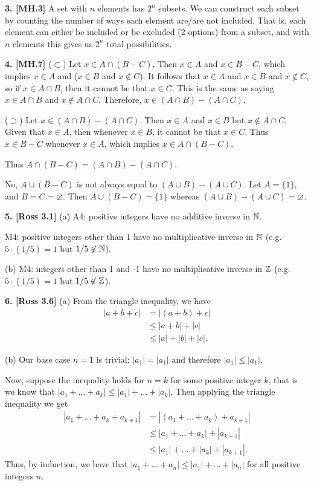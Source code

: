 \textbf{3. [MH.3]} A set with $n$ elements has $2^n$ subsets. We can construct each subset by counting the number of ways each element are/are not included. That is, each element can either be included or be excluded (2 options) from a subset, and with $n$ elements this gives us $2^n$ total possibilities.

\textbf{4. [MH.7]} ($\subset$) Let $x \in A \cap (B - C)$. Then $x \in A$ and $x \in B - C$, which implies $x \in A$ and ($x \in B$ and $x \not\in C$). It follows that $x \in A$ and $x \in B$ and $x \not\in C$, so if $x \in A \cap B$, then it cannot be that $x \in C$. This is the same as saying $x \in A \cap B$ and $x \not\in A \cap C$. Therefore, $x \in (A \cap B) - (A \cap C)$.

($\supset$) Let $x \in (A \cap B) - (A \cap C)$. Then $x \in A$ and $x \in B$ but $x \not\in A \cap C$. Given that $x \in A$, then whenever $x \in B$, it cannot be that $x \in C$. Thus $x \in B - C$ whenever $x \in A$, which implies $x \in A \cap (B - C)$.

Thus $A \cap (B - C) = (A \cap B) - (A \cap C)$.

No, $A \cup (B - C)$ is not always equal to $(A \cup B) - (A \cup C)$. Let $A = \{1\}$, and $B = C = \varnothing$. Then $A \cup (B - C) = \{1\}$ whereas $(A \cup B) - (A \cup C) = \varnothing$.

\textbf{5. [Ross 3.1]} (a) A4: positive integers have no additive inverse in $\mathbb{N}$.

M4: positive integers other than 1 have no multiplicative inverse in $\mathbb{N}$ (e.g. $5 \cdot (1/5) = 1$ but $1/5 \not\in \mathbb{N}$).

(b) M4: integers other than 1 and -1 have no multiplicative inverse in $\mathbb{Z}$ (e.g. $5 \cdot (1/5) = 1$ but $1/5 \not\in \mathbb{Z}$).

\textbf{6. [Ross 3.6]} (a) From the triangle inequality, we have
\begin{align*}
    |a + b + c| &= |(a + b) + c| \\
        &\leq |a + b| + |c| \\
        &\leq |a| + |b| + |c|.
\end{align*}

(b) Our base case $n = 1$ is trivial: $|a_1| = |a_1|$ and therefore $|a_1| \leq |a_1|$.

Now, suppose the inequality holds for $n = k$ for some positive integer $k$, that is we know that $|a_1 + \dots + a_k| \leq |a_1| + \dots + |a_k|$. Then applying the triangle inequality we get
\begin{align*}
    |a_1 + \dots + a_k + a_{k + 1}| &= |(a_1 + \dots + a_k) + a_{k + 1}| \\
        &\leq |a_1 + \dots + a_k| + |a_{k + 1}| \\
        &\leq |a_1| + \dots + |a_k| + |a_{k + 1}|.
\end{align*}
Thus, by induction, we have that $|a_1 + \dots + a_n| \leq |a_1| + \dots + |a_n|$ for all positive integers $n$.

